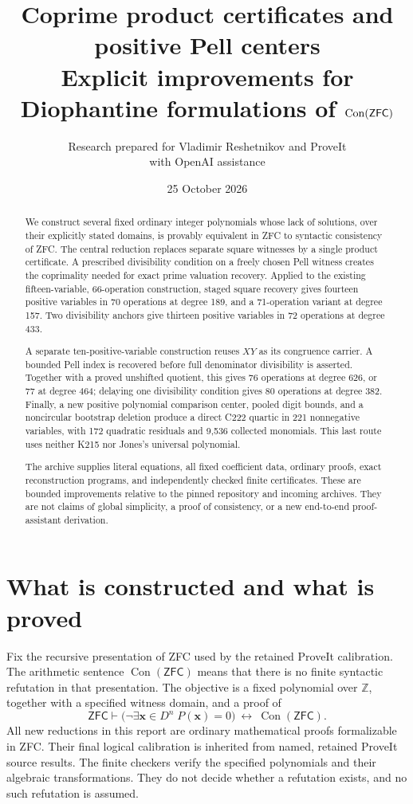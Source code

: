 \documentclass[11pt,letterpaper]{article}
\title{\color{inkblue}\textbf{Coprime product certificates and positive Pell centers}\\[5pt]
\large Explicit improvements for Diophantine formulations of $\Con(\ZFC)$}
\author{Research prepared for Vladimir Reshetnikov and ProveIt\\
\small with OpenAI assistance}
\date{25 October 2026}
\theoremstyle{remark}\newtheorem{remark}[theorem]{Remark}
\newcommand{\Z}{\mathbb Z}
\newcommand{\Con}{\operatorname{Con}}
\newcommand{\ZFC}{\mathsf{ZFC}}
\begin{document}
\maketitle
\begin{abstract}
We construct several fixed ordinary integer polynomials whose lack of solutions,
over their explicitly stated domains, is provably equivalent in ZFC to
syntactic consistency of ZFC. The central reduction replaces separate square
witnesses by a single product certificate. A prescribed divisibility condition
on a freely chosen Pell witness creates the coprimality needed for exact prime
valuation recovery. Applied to the existing fifteen-variable, 66-operation
construction, staged square recovery gives fourteen positive variables in 70
operations at degree 189, and a 71-operation variant at degree 157. Two
divisibility anchors give thirteen positive variables in 72 operations at
degree 433.

A separate ten-positive-variable construction reuses $XY$ as its congruence
carrier. A bounded Pell index is recovered before full denominator divisibility
is asserted. Together with a proved unshifted quotient, this gives 76 operations
at degree 626, or 77 at degree 464; delaying one divisibility condition gives
80 operations at degree 382. Finally, a new positive polynomial comparison
center, pooled digit bounds, and a noncircular bootstrap deletion produce a
direct C222 quartic in 221 nonnegative variables, with 172 quadratic residuals
and 9,536 collected monomials. This last route uses neither K215 nor Jones's
universal polynomial.

The archive supplies literal equations, all fixed coefficient data, ordinary
proofs, exact reconstruction programs, and independently checked finite
certificates. These are bounded improvements relative to the pinned repository
and incoming archives. They are not claims of global simplicity, a proof of
consistency, or a new end-to-end proof-assistant derivation.
\end{abstract}
\thispagestyle{empty}
\clearpage
\tableofcontents
\clearpage

\section{What is constructed and what is proved}

Fix the recursive presentation of ZFC used by the retained ProveIt calibration.
The arithmetic sentence $\Con(\ZFC)$ means that there is no finite syntactic
refutation in that presentation. The objective is a fixed polynomial over
$\Z$, together with a specified witness domain, and a proof of
\[
\ZFC\vdash
\bigl(\neg\exists\boldsymbol{x}\in D^n\;P(\boldsymbol{x})=0\bigr)
\ \longleftrightarrow\ \Con(\ZFC).
\]
All new reductions in this report are ordinary mathematical proofs formalizable
in ZFC. Their final logical calibration is inherited from named, retained
ProveIt source results. The finite checkers verify the specified polynomials
and their algebraic transformations. They do not decide whether a refutation
exists, and no such refutation is assumed.
\end{document}
